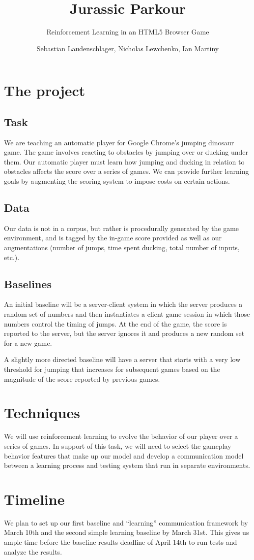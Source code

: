 \documentclass{scrartcl}
\title{Jurassic Parkour}
\subtitle{Reinforcement Learning in an HTML5 Browser Game}
\author{Sebastian Laudenschlager, Nicholas Lewchenko, Ian Martiny}
\begin{document}
\maketitle

\section{The project}

\subsection{Task}
We are teaching an automatic player for Google Chrome's jumping
dinosaur game.  The game involves reacting to obstacles by jumping
over or ducking under them.  Our automatic player must learn how
jumping and ducking in relation to obstacles affects the score over a
series of games.  We can provide further learning goals by augmenting
the scoring system to impose costs on certain actions.

\subsection{Data}
Our data is not in a corpus, but rather is procedurally generated by
the game environment, and is tagged by the in-game score provided as
well as our augmentations (number of jumps, time spent ducking, total
number of inputs, etc.).

\subsection{Baselines}
An initial baseline will be a server-client system in which the server
produces a random set of numbers and then instantiates a client game
session in which those numbers control the timing of jumps.  At the
end of the game, the score is reported to the server, but the server
ignores it and produces a new random set for a new game.

A slightly more directed baseline will have a server that starts with
a very low threshold for jumping that increases for subsequent games
based on the magnitude of the score reported by previous games.

\section{Techniques}
We will use reinforcement learning to evolve the behavior of our
player over a series of games.  In support of this task, we will
need to select the gameplay behavior features that make up our model
and develop a communication model between a learning process and
testing system that run in separate environments.

\section{Timeline}
We plan to set up our first baseline and ``learning'' communication
framework by March 10th and the second simple learning baseline by
March 31st.  This gives us ample time before the baseline results
deadline of April 14th to run tests and analyze the results.
\end{document}

